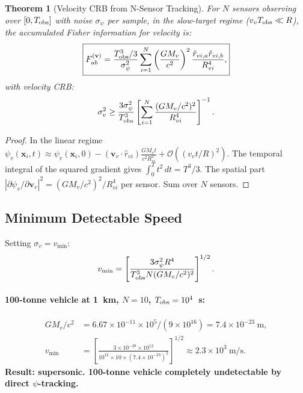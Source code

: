 \documentclass[aps,prd,twocolumn,superscriptaddress,nofootinbib]{revtex4-2}
\newcommand{\order}[1]{\mathcal{O}(#1)}
\newcommand{\xvec}{\mathbf{x}}
\newtheorem{theorem}{Theorem}
\begin{document}
\begin{theorem}[Velocity CRB from N-Sensor Tracking]
\label{thm:tracking-crb}
For $N$ sensors observing over $[0,T_{\rm obs}]$ with noise $\sigma_\psi$ per sample,
in the slow-target regime ($v_v T_{\rm obs} \ll R$), the accumulated
Fisher information for velocity is:
\begin{equation}
\boxed{
F_{ab}^{(\mathbf{v})} = \frac{T_{\rm obs}^3/3}{\sigma_\psi^2}
\sum_{i=1}^N \left(\frac{GM_v}{c^2}\right)^2
\frac{\hat{r}_{vi,a}\hat{r}_{vi,b}}{R_{vi}^4},
}
\label{eq:fim-vel}
\end{equation}
with velocity CRB:
\begin{equation}
\sigma_v^2 \geq \frac{3\sigma_\psi^2}{T_{\rm obs}^3}
\left[\sum_{i=1}^N \frac{(GM_v/c^2)^2}{R_{vi}^4}\right]^{-1}.
\label{eq:vel-crb}
\end{equation}
\end{theorem}

\begin{proof}
In the linear regime $\psi_v(\xvec_i,t) \approx \psi_v(\xvec_i,0)
- (\mathbf{v}_v\cdot\hat{r}_{vi})\frac{GM_v t}{c^2 R_{vi}^2} + \order{(v_v t/R)^2}$.
The temporal integral of the squared gradient gives
$\int_0^T t^2\,dt = T^3/3$.  The spatial part
$|\partial\psi_v/\partial\mathbf{v}_v|^2 = (GM_v/c^2)^2/R_{vi}^4$
per sensor.  Sum over $N$ sensors.
\end{proof}

\subsection{Minimum Detectable Speed}

Setting $\sigma_v = v_{\min}$:
\begin{equation}
v_{\min} = \left[\frac{3\sigma_\psi^2 R^4}{T_{\rm obs}^3 N (GM_v/c^2)^2}\right]^{1/2}.
\label{eq:vmin}
\end{equation}

\paragraph{100-tonne vehicle at 1~km, $N=10$, $T_{\rm obs}=10^4$~s:}
\begin{align}
GM_v/c^2 &= 6.67\times10^{-11}\times10^5/(9\times10^{16}) = 7.4\times10^{-23}~\mathrm{m}, \\
v_{\min} &= \left[\frac{3\times10^{-28}\times10^{12}}{10^{12}\times10\times(7.4\times10^{-23})^2}\right]^{1/2}
\approx 2.3\times10^3~\mathrm{m/s}.
\end{align}
\textbf{Result: supersonic. 100-tonne vehicle completely undetectable by direct $\psi$-tracking.}
\end{document}

